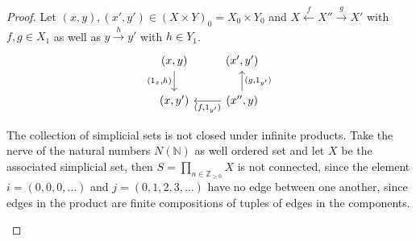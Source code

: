 \begin{proof}
    Let $(x,y),(x',y') \in (X\times Y)_0=X_0 \times Y_0$ and $X \xleftarrow{f}X''\xrightarrow{g}X'$ with $f,g \in X_1$ as well as $y \xrightarrow{h} y'$ with $h \in Y_1$.
    \[
    \begin{tikzcd}
        (x,y)
        \arrow[d,"{( 1_x , h )}"']
        &
        (x',y')
        \\
        (x,y')
        &
        (x'',y)
        \arrow[l, "{(f,1_{y'})}"]
        \arrow[u, "{(g,1_{y'})}"']
    \end{tikzcd}
    \]
    \begin{Warning}
        The collection of simplicial sets is not closed under infinite products.
        Take the nerve of the natural numbers $ N ( \mathbb{ N } ) $ as well ordered set and let $ X $ be the associated simplicial set, then $ S = \prod_{ n \in \mathbb{ Z }_{ \geq 0 } } X $ is not connected, since the element $ i = ( 0 , 0 , 0 ,\dotsc ) $ and $ j = ( 0 , 1 , 2 , 3 , \dotsc ) $ have no edge between one another, since edges in the product are finite compositions of tuples of edges in the components.
    \end{Warning}
\end{proof}

